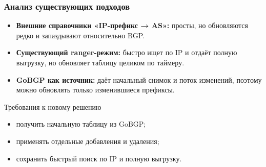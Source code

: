 \begin{frame}\frametitle{Анализ существующих подходов}
\begin{itemize}\setlength{\itemsep}{0.15em}
  \item \textbf{Внешние справочники «IP-префикс → AS»:} просты, но
  обновляются редко и запаздывают относительно BGP.
  \item \textbf{Существующий ranger-режим:} быстро ищет по IP и отдаёт
  полную выгрузку, но обновляет таблицу целиком по таймеру.
  \item \textbf{GoBGP как источник:} даёт начальный снимок и поток изменений,
  поэтому можно обновлять только изменившиеся префиксы.
\end{itemize}
\vspace{0.1em}
\begin{block}{Требования к новому решению}
\begin{itemize}\setlength{\itemsep}{0.05em}
  \item получить начальную таблицу из GoBGP;
  \item применять отдельные добавления и удаления;
  \item сохранить быстрый поиск по IP и полную выгрузку.
\end{itemize}
\end{block}
\end{frame}
